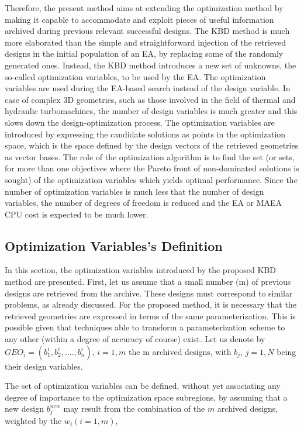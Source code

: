 Therefore, the present method aims at extending the optimization method by making it capable to accommodate and exploit pieces of useful information archived during previous relevant successful designs. The KBD method is much more elaborated than the simple and straightforward injection of the retrieved designs in the initial population of an EA, by replacing some of the randomly generated ones. Instead, the KBD method  introduces a new set of unknowns, the so-called optimization variables, to be used by the EA. The optimization variables are used during the EA-based search instead of the design variable. In case of complex 3D geometries, such as those involved in the field of thermal and hydraulic turbomachines, the number of design variables is much greater and this slows down the design-optimization process. The optimization variables are introduced by expressing the candidate solutions as points in the optimization space, which is the space defined by the design vectors of the retrieved geometries as vector bases. The role of the optimization algorithm is to find the set (or sets, for more than one objectives where the Pareto front of non-dominated solutions is sought) of the optimization variables which yields optimal performance. Since the number of optimization variables is much less that the number of design variables, the number of degrees of freedom is reduced and the EA or MAEA CPU cost is expected to be much lower.

\subsection{Optimization Variables's Definition}
In this section, the optimization variables introduced by the proposed KBD method are presented. First, let us assume that a small number (m) of previous designs are retrieved from the archive. These designs must correspond to similar problems, as already discussed. For the proposed method, it is necessary  that the retrieved geometries are expressed in terms of the same parameterization. This is possible given that techniques able to transform a parameterization scheme to any other (within a degree of accuracy of course) exist. Let us denote by $GEO_i=(b_1^i,b_2^i,....,b_n^i)$, $i\!=\!1,m$ the m archived designs, with $b_j$, $j=1,N$ being their design variables.

The set of optimization variables can be defined, without yet associating any degree of importance to the optimization space subregions, by assuming that a new design $b_j^{new}$ may result from the combination of the $m$ archived designs, weighted by the  $w_i (i=1,m)$,

